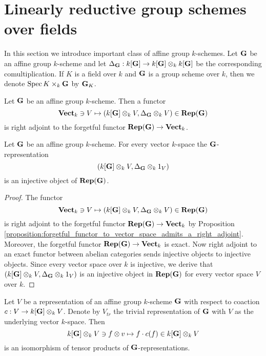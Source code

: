 \section{Linearly reductive group schemes over fields}
\noindent
In this section we introduce important class of affine group $k$-schemes. Let $\mathbf{G}$ be an affine group $k$-scheme and let $\Delta_{\mathbf{G}}:k[\mathbf{G}]\rightarrow k[\mathbf{G}]\otimes_kk[\mathbf{G}]$ be the corresponding comultiplication. If $K$ is a field over $k$ and $\mathbf{G}$ is a group scheme over $k$, then we denote $\mathrm{Spec}\, K\times_k \mathbf{G}$ by $\mathbf{G}_K$.

\begin{proposition}\label{proposition:forgetful_functor_to_vector_space_admits_a_right_adjoint}
Let $\mathbf{G}$ be an affine group $k$-scheme. Then a functor
$$\mathbf{Vect}_k \ni V\mapsto \left(k[\mathbf{G}]\otimes_kV,\Delta_{\mathbf{G}}\otimes_k V \right)\in \mathbf{Rep}(\mathbf{G})$$
is right adjoint to the forgetful functor $\mathbf{Rep}(\mathbf{G})\rightarrow \mathbf{Vect}_k$.
\end{proposition}

\begin{corollary}\label{corollary:canonical_injective_objects_in_representations_of_groups}
Let $\mathbf{G}$ be an affine group $k$-scheme. For every vector $k$-space the $\mathbf{G}$-representation
$$\left(k[\mathbf{G}]\otimes_kV,\Delta_{\mathbf{G}}\otimes_k1_V\right)$$
is an injective object of $\mathbf{Rep}(\mathbf{G})$.
\end{corollary}
\begin{proof}
The functor
$$\mathbf{Vect}_k \ni V\mapsto \left(k[\mathbf{G}]\otimes_kV,\Delta_{\mathbf{G}}\otimes_k V \right)\in \mathbf{Rep}(\mathbf{G})$$
is right adjoint to the forgetful functor $\mathbf{Rep}(\mathbf{G})\rightarrow \mathbf{Vect}_k$ by Proposition \ref{proposition:forgetful_functor_to_vector_space_admits_a_right_adjoint}. Moreover, the forgetful functor $\mathbf{Rep}(\mathbf{G})\rightarrow \mathbf{Vect}_k$ is exact. Now right adjoint to an exact functor between abelian categories sends injective objects to injective objects. Since every vector space over $k$ is injective, we derive that $\left(k[\mathbf{G}]\otimes_kV,\Delta_{\mathbf{G}}\otimes_k1_V\right)$ is an injective object in $\mathbf{Rep}(\mathbf{G})$ for every vector space $V$ over $k$.
\end{proof}

\begin{proposition}\label{proposition:tensor_products_of_representations_and_its_trivial_version_with_regular_representation_are_isomorphic}
Let $V$ be a representation of an affine group $k$-scheme $\mathbf{G}$ with respect to coaction $c:V\rightarrow k[\mathbf{G}]\otimes_kV$. Denote by $V_{tr}$ the trivial representation of $\mathbf{G}$ with $V$ as the underlying vector $k$-space. Then
$$k[\mathbf{G}]\otimes_kV \ni f\otimes v \mapsto f\cdot c(f) \in k[\mathbf{G}]\otimes_kV$$
is an isomorphism of tensor products of $\mathbf{G}$-representations.
\end{proposition}

